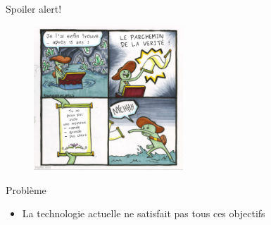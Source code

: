 \documentclass[8pt]{beamer}
\begin{document}
\begin{frame}{Spoiler alert!}
    \begin{figure}
        \centering
        \includegraphics[width=0.5\textwidth]{figures/meme.png}
        \label{fig:memory_speed}
    \end{figure}

    \begin{alertblock}{Problème}
        \begin{itemize}
            \item La technologie actuelle ne satisfait pas tous ces objectifs
        \end{itemize}
    \end{alertblock}
\end{frame}
\end{document}
